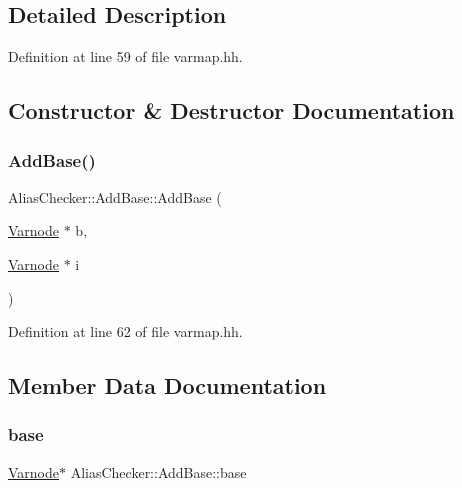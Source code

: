 \subsection{Detailed Description}


Definition at line 59 of file varmap.\+hh.



\subsection{Constructor \& Destructor Documentation}
\mbox{\label{struct_alias_checker_1_1_add_base_a60e46bc207164a1171ffe8aef459135f}} 
\subsubsection{\texorpdfstring{AddBase()}{AddBase()}}
{\footnotesize\ttfamily Alias\+Checker\+::\+Add\+Base\+::\+Add\+Base (\begin{DoxyParamCaption}\item[{\mbox{\hyperlink{class_varnode}{Varnode}} $\ast$}]{b,  }\item[{\mbox{\hyperlink{class_varnode}{Varnode}} $\ast$}]{i }\end{DoxyParamCaption})\hspace{0.3cm}{\ttfamily [inline]}}



Definition at line 62 of file varmap.\+hh.



\subsection{Member Data Documentation}
\mbox{\label{struct_alias_checker_1_1_add_base_a76adc3cfe30ded04528ca4c879a4dbeb}} 
\subsubsection{\texorpdfstring{base}{base}}
{\footnotesize\ttfamily \mbox{\hyperlink{class_varnode}{Varnode}}$\ast$ Alias\+Checker\+::\+Add\+Base\+::base}



